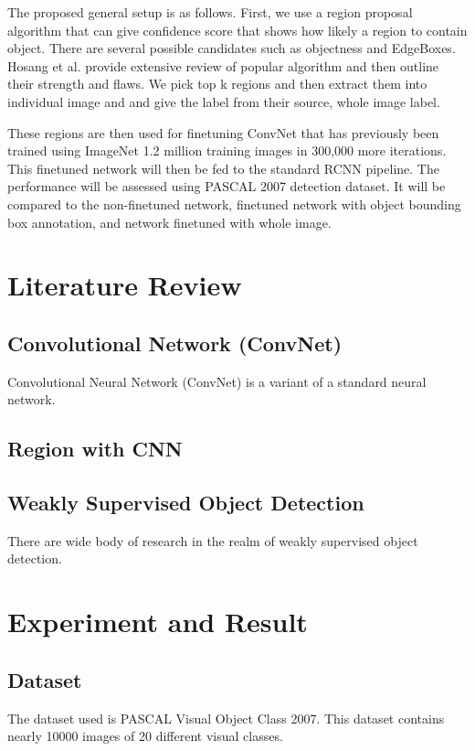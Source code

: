 \documentclass[a4paper,11pt]{kth-mag}
\begin{document}
The proposed general setup is as follows. First, we use a region proposal algorithm that can give confidence score that shows how likely a region to contain object. There are several possible candidates such as objectness \cite{obj} and EdgeBoxes. Hosang et al. \cite{hosang2014} provide extensive review of popular algorithm and then outline their strength and flaws. We pick top k regions and then extract them into individual image and and give the label from their source, whole image label.

These regions are then used for finetuning ConvNet that has previously been trained using ImageNet 1.2 million training images in 300,000 more iterations. This finetuned network will then be fed to the standard RCNN pipeline. The performance will be assessed using PASCAL 2007 detection dataset. It will be compared to the non-finetuned network, finetuned network with object bounding box annotation, and network finetuned with whole image.


\chapter{Literature Review}
\section{Convolutional Network (ConvNet)}
Convolutional Neural Network (ConvNet) is a variant of a standard neural network.

\section{Region with CNN}

\section{Weakly Supervised Object Detection}
There are wide body of research in the realm of weakly supervised object detection.


\chapter{Experiment and Result}
\section{Dataset}
The dataset used is PASCAL Visual Object Class 2007. This dataset contains nearly 10000 images of 20 different visual classes.
\end{document}
